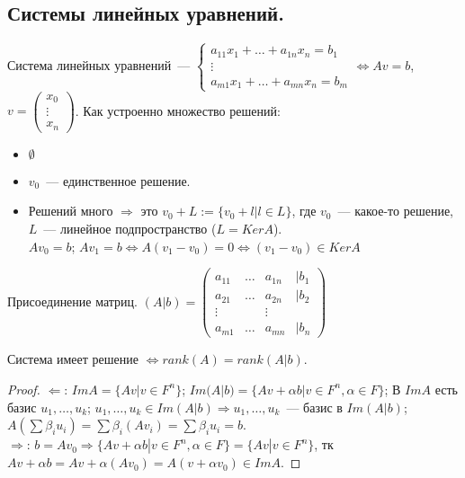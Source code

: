 \documentclass[12pt]{article}
\begin{document}
	\subsection{Системы линейных уравнений.}
	\begin{definition}
		Система линейных уравнений~--- $
		\begin{cases}
			a_{11}x_1 + \dots + a_{1n}x_n = b_1 \\
			\vdots \\
			a_{m1}x_1 + \dots + a_{mn}x_n = b_m
		\end{cases}
		\Leftrightarrow Av = b$, $v =
		\left( \begin{smallmatrix}
			x_0 \\
			\vdots \\
			x_n
		\end{smallmatrix} \right)
		$. Как устроенно множество решений:
		\begin{itemize}
			\item $\emptyset$
			\item $v_0$~--- единственное решение.
			\item Решений много $\Rightarrow$ это $v_0 + L := \{ v_0 + l | l \in L \}$, где $v_0$~--- какое-то решение, $L$~--- линейное подпространство ($L = Ker A$). \\
			$Av_0 = b$; $Av_1 = b \Leftrightarrow A(v_1 - v_0) = 0 \Leftrightarrow (v_1 - v_0) \in Ker A$
		\end{itemize}
	\end{definition}
	\begin{definition}
		Присоединение матриц. $(A | b) = 
		\left( \begin{smallmatrix}
			a_{11} & \dots & a_{1n} & | b_1 \\
			a_{21} & \dots & a_{2n} & | b_2 \\
			\vdots &  & \vdots \\
			a_{m1} & \dots & a_{mn} & | b_n
		\end{smallmatrix} \right)
		$
	\end{definition}
	\begin{theorem}
		Система имеет решение $\Leftrightarrow rank(A) = rank(A|b)$.
	\end{theorem}
	\begin{proof}
		$\Leftarrow$: $ImA = \{ Av | v \in F^n \}$; $Im(A | b) = \{ Av + \alpha b | v \in F^n, \alpha \in F \}$; В $ImA$ есть базис $u_1, \dots, u_k$; $u_1, \dots, u_k \in Im(A | b) \Rightarrow u_1, \dots, u_k$~--- базис в $Im(A | b)$; $A(\sum \beta_i u_i) = \sum \beta_i (Av_i) = \sum \beta_i u_i = b$. \\
		$\Rightarrow$: $b = Av_0 \Rightarrow \{ Av + \alpha b | v \in F^n, \alpha \in F \} = \{ Av | v \in F^n \}$, тк $Av + \alpha b = Av + \alpha (Av_0) = A(v + \alpha v_0) \in ImA$.
	\end{proof}
\end{document}
